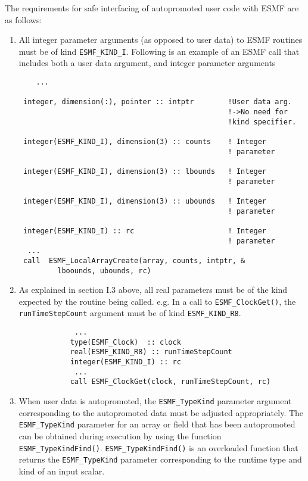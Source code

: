The requirements for safe interfacing of autopromoted user code with ESMF are as follows:
\begin{enumerate}
\item All integer parameter arguments (as opposed to user data) to ESMF routines must be of kind {\tt ESMF\_KIND\_I}. Following is an example of an ESMF call that includes both a user data argument, and integer parameter arguments
\begin{verbatim}
    ...

 integer, dimension(:), pointer :: intptr        !User data arg.
                                                 !->No need for 
                                                 !kind specifier.

 integer(ESMF_KIND_I), dimension(3) :: counts    ! Integer 
                                                 ! parameter 

 integer(ESMF_KIND_I), dimension(3) :: lbounds   ! Integer 
                                                 ! parameter

 integer(ESMF_KIND_I), dimension(3) :: ubounds   ! Integer 
                                                 ! parameter

 integer(ESMF_KIND_I) :: rc                      ! Integer 
                                                 ! parameter
  ...
 call  ESMF_LocalArrayCreate(array, counts, intptr, &
         lboounds, ubounds, rc)
\end{verbatim}

\item As explained in section I.3 above, all real parameters must be of the kind expected by the routine being called. e.g. In a call to {\tt ESMF\_ClockGet()}, the {\tt runTimeStepCount} argument must be of kind {\tt ESMF\_KIND\_R8}.
\begin{verbatim}
             ...
            type(ESMF_Clock)  :: clock
            real(ESMF_KIND_R8) :: runTimeStepCount
            integer(ESMF_KIND_I) :: rc
             ...
            call ESMF_ClockGet(clock, runTimeStepCount, rc)
\end{verbatim}
\item When user data is autopromoted, the {\tt ESMF\_TypeKind} parameter argument corresponding to the autopromoted data must be adjusted appropriately. The {\tt ESMF\_TypeKind} parameter for an array or field that has been autopromoted can be obtained during execution by using the function {\tt ESMF\_TypeKindFind()}. {\tt ESMF\_TypeKindFind()} is an overloaded function that returns the {\tt ESMF\_TypeKind} parameter corresponding to the runtime type and kind of an input scalar.


\end{enumerate}
